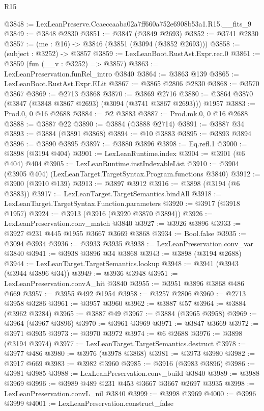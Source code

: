 \begin{lexlean}{R15}
\begin{coremodule}
@3848 := LexLeanPreserve.Ccaeccaaba02a7ff660a752e6908b53a1.R15.__fits_9
@3849 := @3848 @2830
@3851 := @3847 (@3849 @2693)
@3852 := @3741 @2830
@3857 := (me : @16) -> @3846 (@3851 (@3094 (@3852 @2693)))
@3858 := (subject : @3252) -> @3857
@3859 := LexLeanBoot.RustAst.Expr.rec.{0}
@3861 := @3859 (fun (__v : @3252) => @3857)
@3863 := LexLeanPreservation.funRel_intro @3840
@3864 := @3863 @139
@3865 := LexLeanBoot.RustAst.Expr.ELit
@3867 := @3865 @2806 @2830
@3868 := @3570 @3867
@3869 := @2713 @3868
@3870 := @3869 @2716
@3880 := @3864 @3870 (@3847 (@3848 @3867 @2693) (@3094 (@3741 @3867 @2693))) @1957
@3883 := Prod.{0, 0} @16 @2688
@3884 := @2 @3883
@3887 := Prod.mk.{0, 0} @16 @2688
@3888 := @3887 @22
@3890 := @3884 (@3888 @2714)
@3891 := @3887 @34
@3893 := @3884 (@3891 @3868)
@3894 := @10 @3883
@3895 := @3893 @3894
@3896 := @3890 @3895
@3897 := @3880 @3896
@3898 := Eq.refl.{1}
@3900 := @3898 (@3194 @404)
@3901 := LexLeanRuntime.index
@3904 := @3901 (@6 @404) @404
@3905 := LexLeanRuntime.instIndexableList
@3910 := @3904 (@3905 @404) (LexLeanTarget.TargetSyntax.Program.functions @3840)
@3912 := @3900 (@3910 @139)
@3913 := @3897 @3912
@3916 := @3898 (@3194 (@6 @3883))
@3917 := LexLeanTarget.TargetSemantics.bindAll
@3918 := LexLeanTarget.TargetSyntax.Function.parameters
@3920 := @3917 (@3918 @1957)
@3924 := @3913 (@3916 (@3920 @3870 @3894))
@3926 := LexLeanPreservation.conv_match @3840
@3927 := @3926 @3896
@3933 := @3927 @231 @445 @1955 @3667 @3669 @3868
@3934 := Bool.false
@3935 := @3094 @3934
@3936 := @3933 @3935
@3938 := LexLeanPreservation.conv_var @3840
@3941 := @3938 @3896 @34 @3868
@3943 := @3898 (@3194 @2688)
@3944 := LexLeanTarget.TargetSemantics.lookup
@3948 := @3941 (@3943 (@3944 @3896 @34))
@3949 := @3936 @3948
@3951 := LexLeanPreservation.convA_hit @3840
@3955 := @3951 @3896 @3868 @486 @669
@3957 := @3955 @492 @1954
@3958 := @3257 @2806
@3960 := @2713 @3958 @3286
@3961 := @3957 @3960
@3962 := @3887 @57
@3964 := @3884 (@3962 @3284)
@3965 := @3887 @49
@3967 := @3884 (@3965 @3958)
@3969 := @3964 (@3967 @3896)
@3970 := @3961 @3969
@3971 := @3847 @3669
@3972 := @3971 @3935
@3973 := @3970 @3972
@3974 := @6 @2688
@3976 := @3898 (@3194 @3974)
@3977 := LexLeanTarget.TargetSemantics.destruct
@3978 := @3977 @486
@3980 := @3976 (@3978 @3868)
@3981 := @3973 @3980
@3982 := @3917 @669
@3983 := @3982 @3960
@3985 := @3916 (@3983 @3896)
@3986 := @3981 @3985
@3988 := LexLeanPreservation.conv_build @3840
@3989 := @3988 @3969
@3996 := @3989 @489 @231 @453 @3667 @3667 @2697 @3935
@3998 := LexLeanPreservation.convL_nil @3840
@3999 := @3998 @3969
@4000 := @3996 @3999
@4001 := LexLeanPreservation.construct_false

\end{coremodule}
\end{lexlean}
